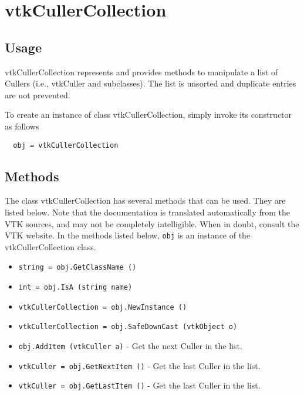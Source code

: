 \section{vtkCullerCollection}

\subsection{Usage}

 vtkCullerCollection represents and provides methods to manipulate a list
 of Cullers (i.e., vtkCuller and subclasses). The list is unsorted and
 duplicate entries are not prevented.

To create an instance of class vtkCullerCollection, simply
invoke its constructor as follows
\begin{verbatim}
  obj = vtkCullerCollection
\end{verbatim}
\subsection{Methods}

The class vtkCullerCollection has several methods that can be used.
  They are listed below.
Note that the documentation is translated automatically from the VTK sources,
and may not be completely intelligible.  When in doubt, consult the VTK website.
In the methods listed below, \verb|obj| is an instance of the vtkCullerCollection class.
\begin{itemize}
\item  \verb|string = obj.GetClassName ()|

\item  \verb|int = obj.IsA (string name)|

\item  \verb|vtkCullerCollection = obj.NewInstance ()|

\item  \verb|vtkCullerCollection = obj.SafeDownCast (vtkObject o)|

\item  \verb|obj.AddItem (vtkCuller a)| -  Get the next Culler in the list.

\item  \verb|vtkCuller = obj.GetNextItem ()| -  Get the last Culler in the list.

\item  \verb|vtkCuller = obj.GetLastItem ()| -  Get the last Culler in the list.

\end{itemize}
